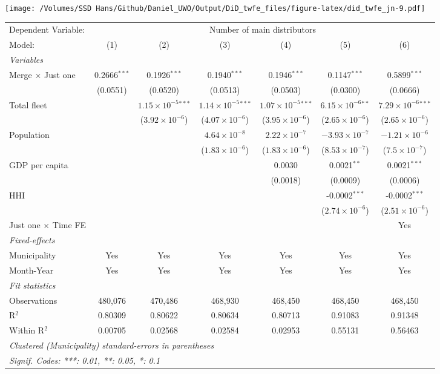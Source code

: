 \documentclass[
]{article}
\begin{document}
\texttt{[image: /Volumes/SSD Hans/Github/Daniel\_UWO/Output/DiD\_twfe\_files/figure-latex/did\_twfe\_jn-9.pdf]}

\begin{tabular}{lcccccc}
\tabularnewline\midrule\midrule
Dependent Variable:&\multicolumn{6}{c}{Number of main distributors}\\
Model:&(1) & (2) & (3) & (4) & (5) & (6)\\
\midrule \emph{Variables}&   &   &   &   &   &  \\
Merge $\times $ Just one & 0.2666$^{***}$ & 0.1926$^{***}$ & 0.1940$^{***}$ & 0.1946$^{***}$ & 0.1147$^{***}$ & 0.5899$^{***}$\\
  &(0.0551) & (0.0520) & (0.0513) & (0.0503) & (0.0300) & (0.0666)\\
Total fleet &    & $1.15\times 10^{-5}$$^{***}$ & $1.14\times 10^{-5}$$^{***}$ & $1.07\times 10^{-5}$$^{***}$ & $6.15\times 10^{-6}$$^{**}$ & $7.29\times 10^{-6}$$^{***}$\\
  &   & ($3.92\times 10^{-6}$) & ($4.07\times 10^{-6}$) & ($3.95\times 10^{-6}$) & ($2.65\times 10^{-6}$) & ($2.65\times 10^{-6}$)\\
Population &    &    & $4.64\times 10^{-8}$ & $2.22\times 10^{-7}$ & $-3.93\times 10^{-7}$ & $-1.21\times 10^{-6}$\\
  &   &    & ($1.83\times 10^{-6}$) & ($1.83\times 10^{-6}$) & ($8.53\times 10^{-7}$) & ($7.5\times 10^{-7}$)\\
GDP per capita &    &    &    & 0.0030 & 0.0021$^{**}$ & 0.0021$^{***}$\\
  &   &    &    & (0.0018) & (0.0009) & (0.0006)\\
HHI &    &    &    &    & -0.0002$^{***}$ & -0.0002$^{***}$\\
  &   &    &    &    & ($2.74\times 10^{-6}$) & ($2.51\times 10^{-6}$)\\
Just one $\times$ Time FE &  &  &  &  &  & Yes\\
\midrule \emph{Fixed-effects}&   &   &   &   &   &  \\
Municipality & Yes & Yes & Yes & Yes & Yes & Yes\\
Month-Year & Yes & Yes & Yes & Yes & Yes & Yes\\
\midrule \emph{Fit statistics}&  & & & & & \\
Observations & 480,076&470,486&468,930&468,450&468,450&468,450\\
R$^2$ & 0.80309&0.80622&0.80634&0.80713&0.91083&0.91348\\
Within R$^2$ & 0.00705&0.02568&0.02584&0.02953&0.55131&0.56463\\
\midrule\midrule\multicolumn{7}{l}{\emph{Clustered (Municipality) standard-errors in parentheses}}\\
\multicolumn{7}{l}{\emph{Signif. Codes: ***: 0.01, **: 0.05, *: 0.1}}\\
\end{tabular}
\end{document}
